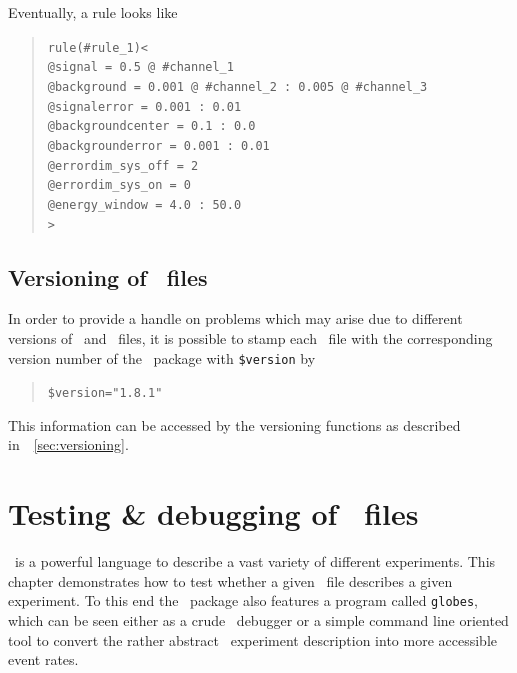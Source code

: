 Eventually, a rule looks like
\begin{quote}
{\tt rule(\#rule\_1)<\\
\tb @signal = 0.5 @ \#channel\_1\\
\tb @background = 0.001 @ \#channel\_2 :  0.005 @ \#channel\_3\\
\tb @signalerror =       0.001  :       0.01\\
\tb @backgroundcenter =  0.1 :       0.0\\
\tb @backgrounderror =   0.001 :       0.01\\
\tb @errordim\_sys\_off = 2\\
\tb @errordim\_sys\_on = 0\\
\tb @energy\_window = 4.0 : 50.0\\ 
>}
\end{quote}
\section{Versioning of \AEDL\ files}
\label{sec:aedl_versioning}

In order to provide a handle on problems which may arise due to different
versions of \GLOBES\ and \AEDL\ files, it is possible to stamp each 
\AEDL\ file with the corresponding version number of the \GLOBES\ package with
{\tt \$version} by
\begin{quote}
{\tt \$version="1.8.1"}
\end{quote}
This information can be accessed by the versioning functions as described in~\Sec~\ref{sec:versioning}.

\chapter{Testing \& debugging of \AEDL\ files}
\label{chap:exp_def}

\AEDL\ is a powerful language to describe a vast variety 
of different experiments.
This chapter demonstrates how to test whether a given \AEDL\ file describes
a given experiment. To this end the \GLOBES\ package also features a program
called {\tt globes}, which can be seen either as a 
crude \AEDL\ debugger 
or a simple command line oriented tool to convert the rather 
abstract \AEDL\ experiment description into more accessible event rates.

